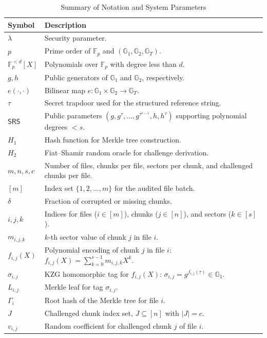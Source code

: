 \documentclass[lettersize,journal]{IEEEtran}
\newcommand{\GG}{\mathbb{G}}
\newcommand{\FF}{\mathbb{F}}
\newcommand{\SRS}{\mathsf{SRS}}
\begin{document}
\begin{table}[htbp]
\centering
\caption{Summary of Notation and System Parameters}
\label{tab:notation}
\begin{tabular}{@{} p{} p{} @{}}
\hline
\textbf{Symbol} & \textbf{Description} \\
\hline
$\lambda$ & Security parameter. \\
$p$ & Prime order of $\FF_p$ and $(\GG_1, \GG_2, \GG_T)$. \\
$\FF_p^{<d}[X]$ & Polynomials over $\FF_p$ with degree less than $d$. \\
$g, h$ & Public generators of $\GG_1$ and $\GG_2$, respectively. \\
$e(\cdot, \cdot)$ & Bilinear map $e: \GG_1 \times \GG_2 \to \GG_T$. \\
$\tau$ & Secret trapdoor used for the structured reference string. \\
$\SRS$ & Public parameters $(g, g^\tau, \dots, g^{\tau^{s-1}}, h, h^\tau)$ supporting polynomial degrees $< s$. \\
$H_1$ & Hash function for Merkle tree construction. \\
$H_2$ & Fiat--Shamir random oracle for challenge derivation. \\
$m, n, s, c$ & Number of files, chunks per file, sectors per chunk, and challenged chunks per file. \\
$[m]$ & Index set $\{1, 2, \dots, m\}$ for the audited file batch. \\
$\delta$ & Fraction of corrupted or missing chunks. \\
$i, j, k$ & Indices for files ($i \in [m]$), chunks ($j \in [n]$), and sectors ($k \in [s]$). \\
$m_{i,j,k}$ & $k$-th sector value of chunk $j$ in file $i$. \\
$f_{i,j}(X)$ & Polynomial encoding of chunk $j$ in file $i$: $f_{i,j}(X) = \sum_{k=0}^{s-1} m_{i,j,k} X^k$. \\
$\sigma_{i,j}$ & KZG homomorphic tag for $f_{i,j}(X)$: $\sigma_{i,j} = g^{f_{i,j}(\tau)} \in \GG_1$. \\
$L_{i,j}$ & Merkle leaf for tag $\sigma_{i,j}$. \\
$\Gamma_i$ & Root hash of the Merkle tree for file $i$. \\
$J$ & Challenged chunk index set, $J \subseteq [n]$ with $|J| = c$. \\
$v_{i,j}$ & Random coefficient for challenged chunk $j$ of file $i$. \\

\end{tabular}
\end{table}
\end{document}
